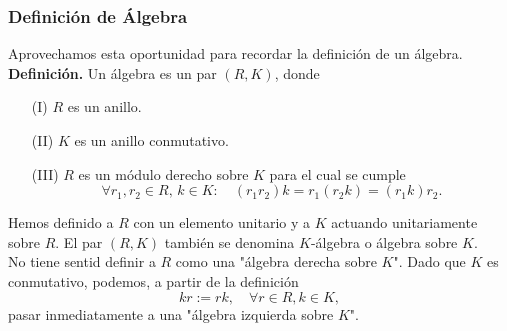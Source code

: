 \documentclass[notes=show]{beamer}%
\begin{document}
\begin{frame}
    \frametitle{Definición de Álgebra}
    Aprovechamos esta oportunidad para recordar la definición de un álgebra.\\
    
    \textbf{Definición.} Un álgebra es un par \( (R, K) \), donde
    \begin{enumerate}
        \item[(I)] \( R \) es un anillo.
        \item[(II)] \( K \) es un anillo conmutativo.
        \item[(III)] \( R \) es un módulo derecho sobre \( K \) para el cual se cumple
        \[
        \forall r_1, r_2 \in R, \, k \in K: \quad (r_1 r_2) k = r_1 (r_2 k) = (r_1 k) r_2.
        \]
    \end{enumerate}


    Hemos definido a \( R \) con un elemento unitario y a \( K \) actuando unitariamente sobre \( R \). 
    El par \( (R, K) \) también se denomina \( K \)-álgebra o álgebra sobre \( K \).\\
    No tiene sentid definir a \( R \) como una "álgebra derecha sobre \( K \)". Dado que \( K \) es conmutativo, podemos, a partir de la definición
    \[
    kr := rk, \quad \forall r \in R, k \in K,
    \]
    pasar inmediatamente a una "álgebra izquierda sobre \( K \)".
    
\end{frame}
\end{document}
